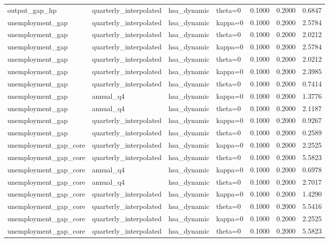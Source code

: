 \begin{tabular}{llllrrr}
output\_gap\_hp & quarterly\_interpolated & hsa\_dynamic & theta=0 & 0.1000 & 0.2000 & 0.6847 \\
unemployment\_gap & quarterly\_interpolated & hsa\_dynamic & kappa=0 & 0.1000 & 0.2000 & 2.5784 \\
unemployment\_gap & quarterly\_interpolated & hsa\_dynamic & theta=0 & 0.1000 & 0.2000 & 2.0212 \\
unemployment\_gap & quarterly\_interpolated & hsa\_dynamic & kappa=0 & 0.1000 & 0.2000 & 2.5784 \\
unemployment\_gap & quarterly\_interpolated & hsa\_dynamic & theta=0 & 0.1000 & 0.2000 & 2.0212 \\
unemployment\_gap & quarterly\_interpolated & hsa\_dynamic & kappa=0 & 0.1000 & 0.2000 & 2.3985 \\
unemployment\_gap & quarterly\_interpolated & hsa\_dynamic & theta=0 & 0.1000 & 0.2000 & 0.7414 \\
unemployment\_gap & annual\_q4 & hsa\_dynamic & kappa=0 & 0.1000 & 0.2000 & 1.3776 \\
unemployment\_gap & annual\_q4 & hsa\_dynamic & theta=0 & 0.1000 & 0.2000 & 2.1187 \\
unemployment\_gap & quarterly\_interpolated & hsa\_dynamic & kappa=0 & 0.1000 & 0.2000 & 0.9267 \\
unemployment\_gap & quarterly\_interpolated & hsa\_dynamic & theta=0 & 0.1000 & 0.2000 & 0.2589 \\
unemployment\_gap\_core & quarterly\_interpolated & hsa\_dynamic & kappa=0 & 0.1000 & 0.2000 & 2.2525 \\
unemployment\_gap\_core & quarterly\_interpolated & hsa\_dynamic & theta=0 & 0.1000 & 0.2000 & 5.5823 \\
unemployment\_gap\_core & annual\_q4 & hsa\_dynamic & kappa=0 & 0.1000 & 0.2000 & 0.6978 \\
unemployment\_gap\_core & annual\_q4 & hsa\_dynamic & theta=0 & 0.1000 & 0.2000 & 2.7017 \\
unemployment\_gap\_core & quarterly\_interpolated & hsa\_dynamic & kappa=0 & 0.1000 & 0.2000 & 1.4290 \\
unemployment\_gap\_core & quarterly\_interpolated & hsa\_dynamic & theta=0 & 0.1000 & 0.2000 & 5.5416 \\
unemployment\_gap\_core & quarterly\_interpolated & hsa\_dynamic & kappa=0 & 0.1000 & 0.2000 & 2.2525 \\
unemployment\_gap\_core & quarterly\_interpolated & hsa\_dynamic & theta=0 & 0.1000 & 0.2000 & 5.5823 \\

\end{tabular}
